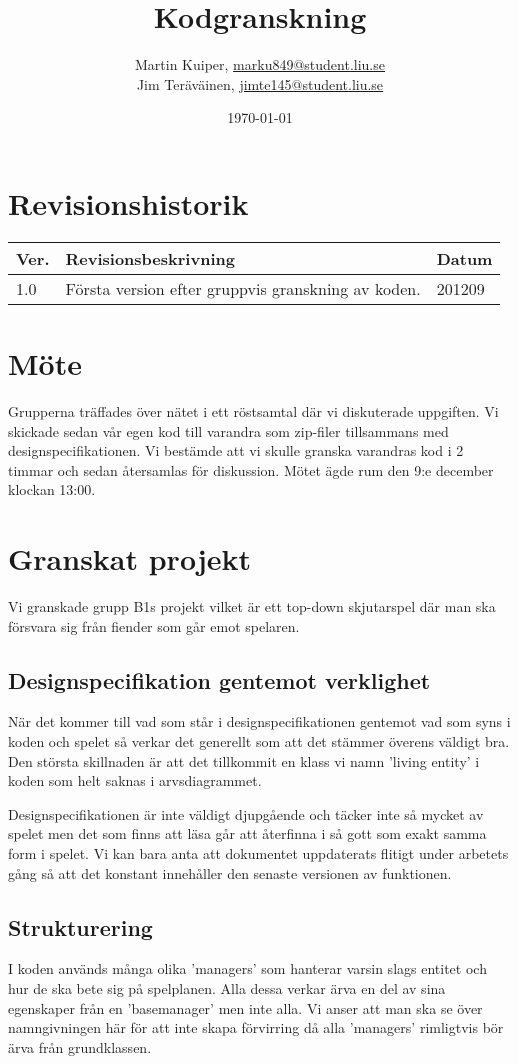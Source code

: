 \documentclass{TDP005mall}
\author{Martin Kuiper, \url{marku849@student.liu.se}\\
  Jim Teräväinen, \url{jimte145@student.liu.se}}
\title{Kodgranskning}
\date{\today}
\begin{document}
\projectpage
\section{Revisionshistorik}
\begin{table}[!h]
\begin{tabularx}{\linewidth}{|l|X|l|}
\hline
Ver. & Revisionsbeskrivning & Datum \\\hline
1.0 & Första version efter gruppvis granskning av koden. & 201209 \\\hline
\end{tabularx}
\end{table}


\section{Möte}
Grupperna träffades över nätet i ett röstsamtal där vi diskuterade uppgiften. Vi skickade sedan vår egen kod till varandra som zip-filer tillsammans med designspecifikationen. Vi bestämde att vi skulle granska varandras kod i 2 timmar och sedan återsamlas för diskussion. Mötet ägde rum den 9:e december klockan 13:00.


\section{Granskat projekt}
Vi granskade grupp B1s projekt vilket är ett top-down skjutarspel där man ska försvara sig från fiender som går emot spelaren.

\subsection{Designspecifikation gentemot verklighet}
När det kommer till vad som står i designspecifikationen gentemot vad som syns i koden och spelet så verkar det generellt som att det stämmer överens väldigt bra. Den största skillnaden är att det tillkommit en klass vi namn 'living entity' i koden som helt saknas i arvsdiagrammet. 

Designspecifikationen är inte väldigt djupgående och täcker inte så mycket av spelet men det som finns att läsa går att återfinna i så gott som exakt samma form i spelet. Vi kan bara anta att dokumentet uppdaterats flitigt under arbetets gång så att det konstant innehåller den senaste versionen av funktionen.

\subsection{Strukturering}
I koden används många olika 'managers' som hanterar varsin slags entitet och hur de ska bete sig på spelplanen. Alla dessa verkar ärva en del av sina egenskaper från en 'basemanager' men inte alla. Vi anser att man ska se över namngivningen här för att inte skapa förvirring då alla 'managers' rimligtvis bör ärva från grundklassen.
\end{document}
